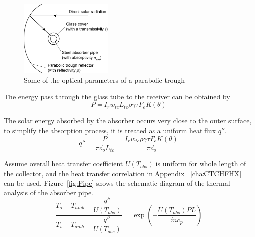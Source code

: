 \begin{figure}[!ht]
\centering
\includegraphics[width=0.4\textwidth]{fig/ParametersOfParablicDish.pdf}
\caption{Some of the optical parameters of a parabolic trough}\label{fig:ParabolicTrough}
\end{figure}

The energy pass through the glass tube to the receiver can be obtained by
\begin{equation}
  P = I_r w_{tc} L_{tc} \rho \gamma \tau F_e K(\theta)
\end{equation}

The solar energy absorbed by the absorber occurs very close to the outer surface, to simplify the absorption process, it is treated as a uniform heat flux $q''$.
\begin{equation}
  q''= \frac{P}{\pi d_o L_{tc}} = \frac{I_r w_{tc} \rho \gamma \tau F_e K(\theta)}{\pi d_o}
\end{equation}
%
%

Assume overall heat transfer coefficient $U(T_{abs})$ is uniform for whole length of the collector, and the heat transfer correlation in Appendix ~\ref{cha:CTCHFHX} can be used. Figure~\ref{fig:Pipe} shows the schematic diagram of the thermal analysis of the absorber pipe.
\begin{equation}
	\frac{T_{o}-T_{amb}-\dfrac{q''}{U(T_{abs})}}{T_{i}-T_{amb}-\dfrac{q''}{U(T_{abs})}}=\exp(-\frac{U(T_{abs})PL}{\dot{m}c_{p}})\label{eq:CTCHF}
\end{equation}

